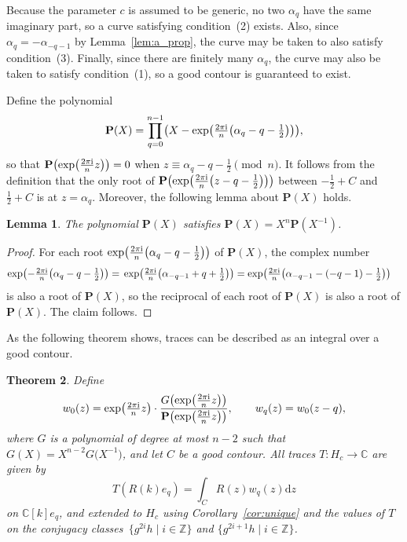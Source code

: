 \documentclass[pdftex]{sigma}
\newcommand\ZZ{\mathbb{Z}}
\newcommand\CC{\mathbb{C}}
\newcommand\bP{\textbf{P}}
\newcommand\rn{\frac{2\pi {\rm i}}{n}}
\newcommand\trn{\tfrac{2\pi {\rm i}}{n}}
\renewcommand\d{\mathrm{d}}
\newcommand\half{\ensuremath{\frac{1}{2}}}
\newcommand\thalf{\ensuremath{\tfrac12}}
\numberwithin{equation}{section}
\newtheorem{Theorem}{Theorem}[section]
\newtheorem{Lemma}[Theorem]{Lemma}
\theoremstyle{definition}
\begin{document}
Because the parameter $c$ is assumed to be generic,
no two $\alpha_q$ have the same imaginary part,
so a curve satisfying condition~(2) exists.
Also, since $\alpha_q = -\alpha_{-q - 1}$ by Lemma~\ref{lem:a_prop},
the curve may be taken to also satisfy condition~(3).
Finally, since there are finitely many $\alpha_q$,
the curve may also be taken to satisfy condition~(1),
so a good contour is guaranteed to exist.


Define the polynomial
\begin{equation*}
 \bP(X) = \prod\limits_{q = 0}^{n - 1}
 \bigl( X - \exp\bigl(\trn \bigl( \alpha_q - q - \thalf \bigr)\bigr)
 \bigr),
\end{equation*}
so that $\bP\bigl(\exp\bigl(\trn z\bigr)\bigr) = 0$ when
$z \equiv \alpha_q - q - \half \pmod{n}$.
It follows from the definition that the only root of
$\bP\bigl(\exp\bigl(\rn \bigl(z - q - \half\bigr)\bigr)\bigr)$
between $-\half + C$ and $\half + C$
is at $z = \alpha_q$.
Moreover, the following lemma about $\bP(X)$ holds.

\begin{Lemma}
 \label{lem:P_sym}
 The polynomial $\bP(X)$ satisfies $\bP(X) = X^n \bP(X^{-1})$.
\end{Lemma}

\begin{proof}
 For each root $\exp\bigl(\rn \bigl(\alpha_q - q - \half\bigr)\bigr)$ of $\bP(X)$,
 the complex number
 \begin{align*}
 \exp\bigl(-\trn \bigl( \alpha_q - q - \thalf \bigr)\bigr)
 ={}& \exp\bigl(\trn \bigl( \alpha_{-q - 1} + q + \thalf \bigr)\bigr)= \exp\bigl(\trn
 \bigl( \alpha_{-q - 1} - (-q - 1) - \thalf \bigr)\bigr)
 \end{align*}
 is also a root of $\bP(X)$,
 so the reciprocal of each root of $\bP(X)$
 is also a root of $\bP(X)$.
 The claim follows.
\end{proof}


As the following theorem shows,
traces can be described as an integral over a good contour.


\begin{Theorem}
 \label{thm:analytic_formula}
 Define
 \begin{align*}
 w_0 (z) =
 \exp\bigl(\trn z\bigr) \cdot
 \frac{G\bigl(\exp\bigl(\rn z\bigr)\bigr)}{\bP\bigl(\exp\bigl(\rn z\bigr)\bigr)}, \qquad
 w_q (z) = w_0 (z - q),
 \end{align*}
 where $G$ is a polynomial of degree at most $n - 2$
 such that $G(X) = X^{n - 2} G\bigl(X^{-1}\bigr)$,
 and let $C$ be a good contour.
 All traces $T \colon H_c \rightarrow \CC$ are given by
 \begin{equation*}
 T ( R(k) e_q ) = \int_C R(z) w_q(z) \d z
 \end{equation*}
 on $\CC[k] e_q$, and extended to $H_c$
 using Corollary~{\rm\ref{cor:unique}}
 and the values of $T$ on the conjugacy classes~${\big\{g^{2i} h \mid i \in \ZZ\big\}}$ and $\big\{g^{2i + 1} h \mid i \in \ZZ\big\}$.
\end{Theorem}
\end{document}

